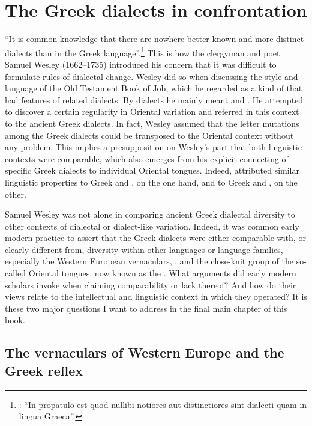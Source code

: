 \chapter{The Greek dialects in confrontation}\label{chap:8}

“It is common knowledge that there are nowhere better-known and more distinct dialects than in the Greek language”.\footnote{\citet[23]{Wesley1736}: “In propatulo est quod nullibi notiores aut distinctiores sint dialecti quam in lingua Graeca”.} This is how the  clergyman and poet Samuel Wesley (1662–1735) introduced his concern that it was difficult to formulate rules of dialectal change. Wesley did so when discussing the style and language of the Old Testament Book of Job, which he regarded as a kind of  that had features of related dialects. By dialects he mainly meant  and . He attempted to discover a certain regularity in Oriental variation and referred in this context to the ancient Greek dialects. In fact, Wesley assumed that the letter mutations among the Greek dialects could be transposed to the Oriental context without any problem. This implies a presupposition on Wesley’s part that both linguistic contexts were comparable, which also emerges from his explicit connecting of specific Greek dialects to individual Oriental tongues. Indeed, \citet[24]{Wesley1736} attributed similar linguistic properties to  Greek and , on the one hand, and to  Greek and , on the other.

Samuel Wesley was not alone in comparing ancient Greek dialectal diversity to other contexts of dialectal or dialect-like variation. Indeed, it was common early modern practice to assert that the Greek dialects were either comparable with, or clearly different from, diversity within other languages or language families, especially the Western European vernaculars, , and the close-knit group of the so-called Oriental tongues, now known as the  . What arguments did early modern scholars invoke when claiming comparability or lack thereof? And how do their views relate to the intellectual and linguistic context in which they operated? It is these two major questions I want to address in the final main chapter of this book.

\section{The vernaculars of Western Europe and the Greek reflex}\label{sec:8.1}

